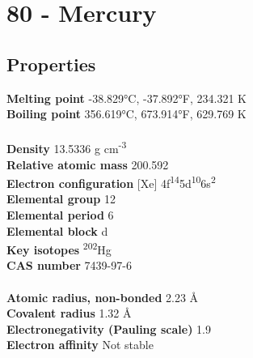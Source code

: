 \section{80 - Mercury}
\label{sec:elem-mercury}
\subsection{Properties}
\textbf{Melting point} -38.829°C, -37.892°F, 234.321 K\\
\textbf{Boiling point} 356.619°C, 673.914°F, 629.769 K\\
\\
\textbf{Density} 13.5336 g cm\textsuperscript{-3}\\
\textbf{Relative atomic mass} 200.592\\
\textbf{Electron configuration} [Xe] 4f\textsuperscript{14}5d\textsuperscript{10}6s\textsuperscript{2}\\
\textbf{Elemental group} 12\\
\textbf{Elemental period} 6\\
\textbf{Elemental block} d\\
\textbf{Key isotopes} \textsuperscript{202}Hg\\
\textbf{CAS number} 7439-97-6\\
\\
\textbf{Atomic radius, non-bonded} 2.23 Å\\
\textbf{Covalent radius} 1.32 Å\\
\textbf{Electronegativity (Pauling scale)} 1.9\\
\textbf{Electron affinity} Not stable\\
